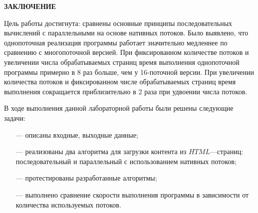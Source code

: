 \begin{center}
    \textbf{ЗАКЛЮЧЕНИЕ}
\end{center}

Цель работы достигнута: сравнены основные принципы последовательных вычислений с параллельными на основе нативных потоков. Было выявлено, что однопоточная реализация программы работает значительно медленнее по сравнению с многопоточной версией. При фиксированном количестве потоков и увеличении числа обрабатываемых страниц время выполнения однопоточной программы примерно в 8 раз больше, чем у 16-поточной версии. При увеличении количества потоков и фиксированном числе обрабатываемых страниц время выполнения сокращается приблизительно в 2 раза при удвоении числа потоков.

\vspace{5mm}

В ходе выполнения данной лабораторной работы были решены следующие задачи:
\begin{itemize}
    \item[---] описаны входные, выходные данные;
    \item[---] реализованы два алгоритма для загрузки контента из $HTML$---страниц: последовательный и параллельный с использованием нативных потоков;
    \item[---] протестированы разработанные алгоритмы;
    \item[---] выполнено сравнение скорости выполнения программы в зависимости от количества используемых потоков.
\end{itemize}